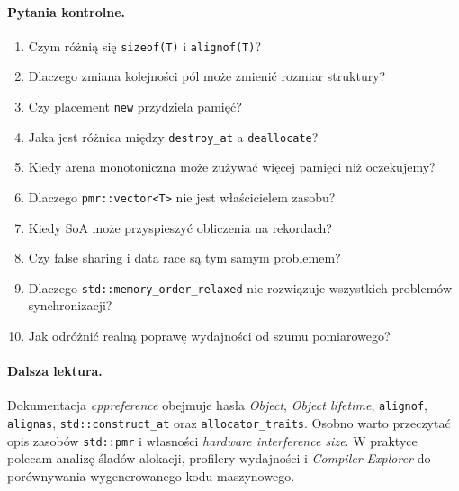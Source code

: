 \paragraph{Pytania kontrolne.}
\begin{enumerate}
\item Czym różnią się \texttt{sizeof(T)} i \texttt{alignof(T)}?
\item Dlaczego zmiana kolejności pól może zmienić rozmiar struktury?
\item Czy placement \texttt{new} przydziela pamięć?
\item Jaka jest różnica między \texttt{destroy\_at} a \texttt{deallocate}?
\item Kiedy arena monotoniczna może zużywać więcej pamięci niż oczekujemy?
\item Dlaczego \texttt{pmr::vector<T>} nie jest właścicielem zasobu?
\item Kiedy SoA może przyspieszyć obliczenia na rekordach?
\item Czy false sharing i data race są tym samym problemem?
\item Dlaczego \texttt{std::memory\_order\_relaxed} nie rozwiązuje
      wszystkich problemów synchronizacji?
\item Jak odróżnić realną poprawę wydajności od szumu pomiarowego?
\end{enumerate}

\paragraph{Dalsza lektura.}
Dokumentacja \emph{cppreference} obejmuje hasła \emph{Object},
\emph{Object lifetime}, \texttt{alignof}, \texttt{alignas},
\texttt{std::construct\_at} oraz \texttt{allocator\_traits}.
Osobno warto przeczytać opis zasobów \texttt{std::pmr}
i własności \emph{hardware interference size}.
W praktyce polecam analizę śladów alokacji, profilery
wydajności i \emph{Compiler Explorer} do porównywania
wygenerowanego kodu maszynowego.
